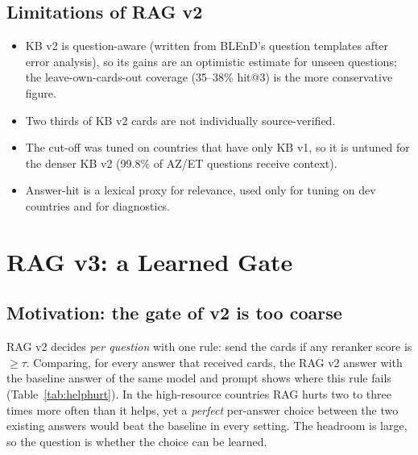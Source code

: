\documentclass[11pt]{article}
\begin{document}
\subsection{Limitations of RAG v2}
\begin{itemize}
\item KB v2 is question-aware (written from BLEnD's question templates after error analysis), so its
gains are an optimistic estimate for unseen questions; the leave-own-cards-out coverage (35--38\%
hit@3) is the more conservative figure.
\item Two thirds of KB v2 cards are not individually source-verified.
\item The cut-off was tuned on countries that have only KB v1, so it is untuned for the denser KB v2
(99.8\% of AZ/ET questions receive context).
\item Answer-hit is a lexical proxy for relevance, used only for tuning on dev countries and for
diagnostics.
\end{itemize}

\section{RAG v3: a Learned Gate}

\subsection{Motivation: the gate of v2 is too coarse}
RAG v2 decides \emph{per question} with one rule: send the cards if any reranker score is
$\geq\tau$. Comparing, for every answer that received cards, the RAG v2 answer with the baseline answer
of the same model and prompt shows where this rule fails (Table~\ref{tab:helphurt}). In the
high-resource countries RAG hurts two to three times more often than it helps, yet a \emph{perfect}
per-answer choice between the two existing answers would beat the baseline in every setting. The
headroom is large, so the question is whether the choice can be learned.
\end{document}
